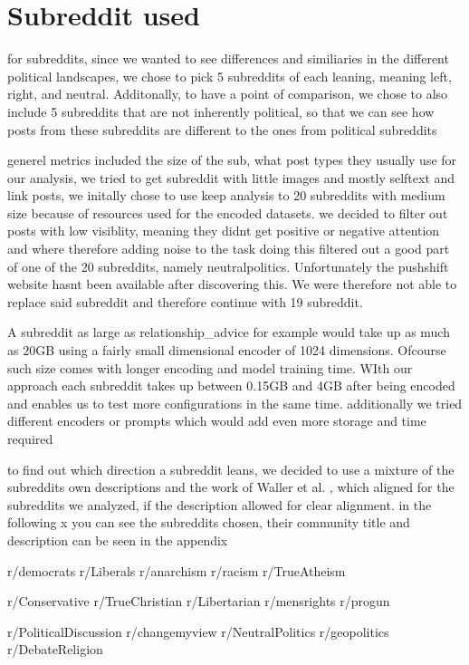 \section{Subreddit used}

for subreddits, since we wanted to see differences and similiaries in the different political landscapes, we chose to pick 5 subreddits of each leaning, meaning left, right, and neutral. Additonally, to have a point of comparison, we chose to also include 5 subreddits that are not inherently political, so that we can see how posts from these subreddits are different to the ones from political subreddits


generel metrics included the size of the sub, what post types they usually use 
for our analysis, we tried to get subreddit with little images and mostly selftext and link posts, 
we initally chose to use keep analysis to 20 subreddits with medium size because of resources used for the encoded datasets. 
we decided to filter out posts with low visiblity, meaning they didnt get positive or negative attention and where therefore adding noise to the task
doing this filtered out a good part of one of the 20 subreddits, namely neutralpolitics. Unfortunately the pushshift website hasnt been available after discovering this. We were therefore not able to replace said subreddit and therefore continue with 19 subreddit.

A subreddit as large as relationship\_advice for example would take up as much as 20GB using a fairly small dimensional encoder of 1024 dimensions. 
Ofcourse such size comes with longer encoding and model training time. WIth our approach each subreddit takes up between 0.15GB and 4GB after being encoded and enables us to test more configurations in the same time. 
additionally we tried different encoders or prompts which would add even more storage and time required

to find out which direction a subreddit leans, we decided to use a mixture of the subreddits own descriptions and the work of Waller et al. \cite{waller2021quantifying}, which aligned for the subreddits we analyzed, if the description allowed for clear alignment.
in the following x you can see the subreddits chosen, their community title and description can be seen in the appendix

r/democrats
r/Liberals
r/anarchism
r/racism
r/TrueAtheism

r/Conservative
r/TrueChristian
r/Libertarian
r/mensrights
r/progun

r/PoliticalDiscussion
r/changemyview
r/NeutralPolitics
r/geopolitics
r/DebateReligion


